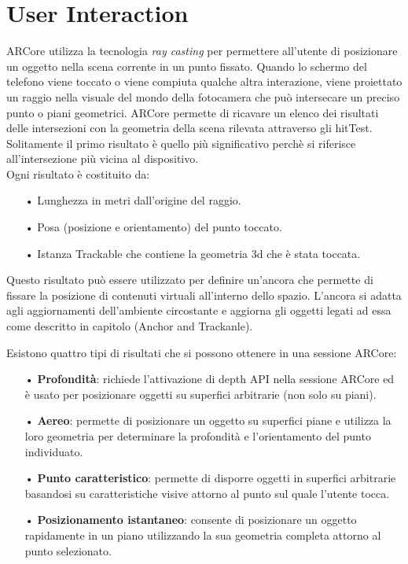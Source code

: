 \documentclass[crop=false, class=book]{standalone}
\begin{document}
	\chapter{User Interaction}
	ARCore utilizza la tecnologia \textit{ray casting} per permettere all'utente di posizionare un oggetto nella scena corrente 	in un punto fissato. Quando lo schermo del telefono viene toccato o viene compiuta qualche altra interazione, 					viene proiettato un raggio nella visuale del mondo della fotocamera che può intersecare un preciso punto o piani geometrici. ARCore permette di ricavare un elenco dei risultati delle intersezioni con la geometria della scena rilevata attraverso gli hitTest. Solitamente il primo risultato è quello più significativo perchè si riferisce all'intersezione più vicina al dispositivo.\\
	Ogni risultato è costituito da:
	
	\begin{itemize}
		\item[•] Lunghezza in metri dall'origine del raggio.
		\item[•] Posa (posizione e orientamento) del punto toccato.
		\item[•] Istanza Trackable che contiene la geometria 3d che è stata toccata.
	\end{itemize}
	
	\begin{flushleft}
	Questo risultato può essere utilizzato per definire un'ancora che permette di fissare la posizione di 							contenuti virtuali all'interno dello spazio. L'ancora si adatta agli aggiornamenti dell'ambiente circostante e aggiorna gli 	oggetti legati ad essa come descritto in capitolo (Anchor and Trackanle).\\
	\end{flushleft}	
		Esistono quattro tipi di risultati che si possono ottenere in una sessione ARCore:
		\begin{itemize}
		\item[•] \textbf{Profondità}: richiede l'attivazione di depth API nella sessione ARCore ed è usato per posizionare oggetti su superfici arbitrarie (non solo su piani).
		\item[•]\textbf{Aereo}: permette di posizionare un oggetto su superfici piane e utilizza la loro geometria per determinare la profondità e l'orientamento del punto individuato.
		\item[•] \textbf{Punto caratteristico}: permette di disporre oggetti in superfici arbitrarie basandosi su caratteristiche visive attorno al punto sul quale l'utente tocca. 
		\item[•] \textbf{Posizionamento istantaneo}: consente di posizionare un oggetto rapidamente in un piano utilizzando la sua geometria completa attorno al punto selezionato. 
	\end{itemize}
	
\end{document}
